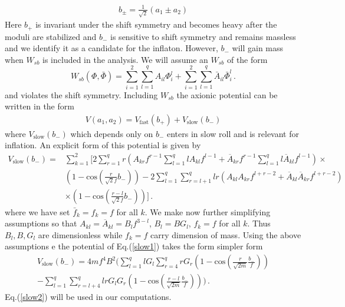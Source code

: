 \documentclass[12pt]{article}
\begin{document}
\begin{align}
  b_{\pm}= \frac{1}{\sqrt 2} (a_1\pm a_2)
  \label{b+b-}
\end{align}
Here $b_+$ is invariant under the shift symmetry and becomes heavy after the moduli are stabilized and $b_-$ is sensitive
to shift symmetry and remains massless and we identify it as a candidate for the inflaton. However, $b_-$ will gain mass
when $W_{sb}$ is included in the analysis. We will assume an $W_{sb}$ of the form
\begin{equation}
  W_{sb} \left( \Phi,\bar \Phi \right) =
  \sum_{i= 1}^{2} \sum_{l = 1}^{q} {A}_{i l} {\Phi}_{i}^{l} + \sum_{i = 1}^{2} \sum_{l = 1}^{q} {\bar{A}}_{i l} {\bar{\Phi}}_{i}^{l}\,.
  \label{wsn1}
\end{equation}
and violates the shift symmetry. Including $W_{sb}$ the axionic potential can be written in the form
\begin{align}
  V(a_1,a_2) = V_{\text{fast}}(b_+) + V_{\text{slow}}(b_-)
\end{align}
where $V_{\text{slow}}(b_-)$ which depends only on $b_-$ enters in slow roll and is relevant for inflation.
An explicit form of this potential is given by
\begin{align}
  {V}_{\text{slow}} (b_-) = & \sum_{k = 1}^{2} \Big[ 2 \sum_{r = 1}^{q} r \left( {A}_{k r} {f}^{r - 1} \sum_{l = 1}^{q} l {A}_{k l} {f}^{l - 1} + {\overline{A}}_{k r} {{f}}^{r - 1} \sum_{l = 1}^{q} l \overline{{A}}_{k l} {{f}}^{l - 1} \right) \times \nonumber\\
                            & \left( 1 - \text{cos} \left( \frac{r}{ \sqrt 2 f}
    {b}_{-}\right) \right)
    - 2 \sum_{l = 1}^{q} \sum_{r = l + 1}^{q} l r \left( {A}_{k l} {A}_{k r} {f}^{l + r - 2} + {\overline{A}}_{k l} {\overline{A}}_{k r} {{f}}^{l + r - 2} \right)\nonumber\\
                            & \times \left( 1 - \text{cos} \left( \frac{r - l}{\sqrt 2 f } {b}_{-}\right) \right) \Big]\,.
  \label{slow1}
\end{align}
where we have set $\bar f_k=f_k=f$ for all $k$.
We make now further simplifying assumptions so that
${A}_{k l} = {\overline{A}}_{k l} = {B}_{l} {f}^{3 - l}$, ${B}_{l} = B {G}_{l}$, ${f}_{k} = f$ for all $k$. Thus $B_l, B, G_l$ are dimensionless while $f_k=f$ carry dimension of mass. Using the above assumptions
e the potential of Eq.(\ref{slow1}) takes the form simpler form
\begin{equation}
  \begin{aligned}
    {V}_{\text{slow}} \left( {b}_{-} \right) =
    4 m {f}^{4} {B}^{2} \Big( \sum_{l = 1}^{q} l {G}_{l} \sum_{r = 4}^{q} r {G}_{r} \left( 1 - \text{cos} \left( \frac{r}{\sqrt{2 m}} \frac{{b}_{-}}{f} \right) \right) \\
    - \sum_{l = 1}^{q} \sum_{r = l + 4}^{q} l r {G}_{l} {G}_{r} \left( 1 - \text{cos} \left( \frac{r - l}{\sqrt{2 m}} \frac{{b}_{-}}{f} \right) \right) \Big)\,.
    \label{slow2}
  \end{aligned}
\end{equation}
Eq.(\ref{slow2}) will be used in our computations.\\
\end{document}
